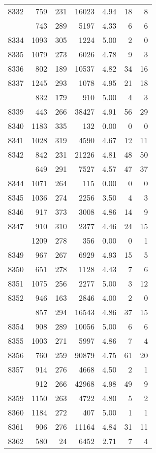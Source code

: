 \documentclass[
]{article}
\begin{document}
\begin{table}
\begin{tabular}[t]{lrrrrrr}
8332 & 759 & 231 & 16023 & 4.94 & 18 & 8\\
\addlinespace
8333 & 743 & 289 & 5197 & 4.33 & 6 & 6\\
8334 & 1093 & 305 & 1224 & 5.00 & 2 & 0\\
8335 & 1079 & 273 & 6026 & 4.78 & 9 & 3\\
8336 & 802 & 189 & 10537 & 4.82 & 34 & 16\\
8337 & 1245 & 293 & 1078 & 4.95 & 21 & 18\\
\addlinespace
8338 & 832 & 179 & 910 & 5.00 & 4 & 3\\
8339 & 443 & 266 & 38427 & 4.91 & 56 & 29\\
8340 & 1183 & 335 & 132 & 0.00 & 0 & 0\\
8341 & 1028 & 319 & 4590 & 4.67 & 12 & 11\\
8342 & 842 & 231 & 21226 & 4.81 & 48 & 50\\
\addlinespace
8343 & 649 & 291 & 7527 & 4.57 & 47 & 37\\
8344 & 1071 & 264 & 115 & 0.00 & 0 & 0\\
8345 & 1036 & 274 & 2256 & 3.50 & 4 & 3\\
8346 & 917 & 373 & 3008 & 4.86 & 14 & 9\\
8347 & 910 & 310 & 2377 & 4.46 & 24 & 15\\
\addlinespace
8348 & 1209 & 278 & 356 & 0.00 & 0 & 1\\
8349 & 967 & 267 & 6929 & 4.93 & 15 & 5\\
8350 & 651 & 278 & 1128 & 4.43 & 7 & 6\\
8351 & 1075 & 256 & 2277 & 5.00 & 3 & 12\\
8352 & 946 & 163 & 2846 & 4.00 & 2 & 0\\
\addlinespace
8353 & 857 & 294 & 16543 & 4.86 & 37 & 15\\
8354 & 908 & 289 & 10056 & 5.00 & 6 & 6\\
8355 & 1003 & 271 & 5997 & 4.86 & 7 & 4\\
8356 & 760 & 259 & 90879 & 4.75 & 61 & 20\\
8357 & 914 & 276 & 4668 & 4.50 & 2 & 1\\
\addlinespace
8358 & 912 & 266 & 42968 & 4.98 & 49 & 9\\
8359 & 1150 & 263 & 4722 & 4.80 & 5 & 2\\
8360 & 1184 & 272 & 407 & 5.00 & 1 & 1\\
8361 & 906 & 276 & 11164 & 4.84 & 31 & 11\\
8362 & 580 & 24 & 6452 & 2.71 & 7 & 4\\

\end{tabular}
\end{table}
\end{document}
